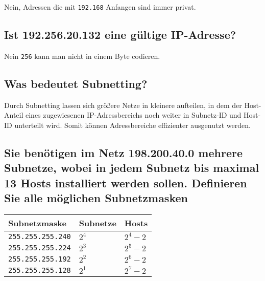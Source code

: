 \documentclass{article}
\begin{document}
Nein, Adressen die mit \texttt{192.168} Anfangen sind immer privat.

\subsection{Ist 192.256.20.132 eine gültige IP-Adresse?}

Nein \texttt{256} kann man nicht in einem Byte codieren.

\subsection{Was bedeutet Subnetting?}

Durch Subnetting lassen sich größere Netze in kleinere aufteilen, in dem der Host-Anteil eines zugewiesenen IP-Adressbereichs
noch weiter in Subnetz-ID und Host-ID unterteilt wird. Somit können Adressbereiche effizienter ausgenutzt werden.

\subsection{Sie benötigen im Netz 198.200.40.0 mehrere Subnetze, wobei in jedem Subnetz bis maximal 13 Hosts installiert werden sollen. Definieren Sie alle möglichen Subnetzmasken}

\begin{center}
	\begin{tabular}{|l|l|l|}
		\hline
		\textbf{Subnetzmaske}    & \textbf{Subnetze} & \textbf{Hosts} \\
		\hline
		\texttt{255.255.255.240} & $2^4$             & $2^4 - 2$   \\
		\hline
		\texttt{255.255.255.224} & $2^3$             & $2^5 - 2$   \\
		\hline
		\texttt{255.255.255.192} & $2^2$             & $2^6 - 2$    \\
		\hline
		\texttt{255.255.255.128} & $2^1$             & $2^7 - 2$    \\
		\hline
	\end{tabular}
\end{center}
\end{document}
